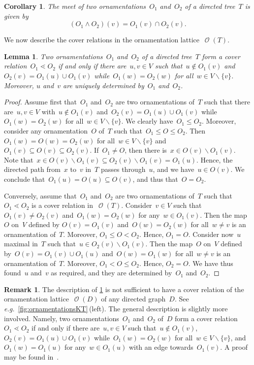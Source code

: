 \documentclass{amsart}
\newtheorem{corollary}[theorem]{Corollary}
\newtheorem{lemma}[theorem]{Lemma}
\theoremstyle{definition}
\newtheorem{remark}[theorem]{Remark}
\renewcommand{\c}[1]{\mathcal{#1}} %
\newcommand{\ssm}{\smallsetminus} %
\newcommand{\eg}{\textit{e.g.}~} %
\newcommand{\meet}{\wedge} %
\DeclareMathOperator{\Orn}{\c{O}}  %
\begin{document}
\begin{corollary}
\label{coro:meetOrnT}
The meet of two ornamentations~$O_1$ and~$O_2$ of a directed tree~$T$ is given by
\[
(O_1 \meet O_2)(v) = O_1(v) \cap O_2(v).
\]
\end{corollary}

We now describe the cover relations in the ornamentation lattice~$\Orn(T)$.

\begin{lemma}
\label{lem:coverRelationsOrnT}
Two ornamentations~$O_1$ and~$O_2$ of a directed tree~$T$ form a cover relation~$O_1 \lessdot O_2$ if and only if there are~$u, v \in V$ such that~$u \notin O_1(v)$ and $O_2(v) = O_1(u) \cup O_1(v)$ while~$O_1(w) = O_2(w)$ for all~${w \in V \ssm \{v\}}$.
Moreover, $u$ and~$v$ are uniquely determined by~$O_1$ and~$O_2$.
\end{lemma}

\begin{proof}
Assume first that~$O_1$ and~$O_2$ are two ornamentations of~$T$ such that there are~$u, v \in V$ with~$u \notin O_1(v)$ and~$O_2(v) = O_1(u) \cup O_1(v)$ while~$O_1(w) = O_2(w)$ for all~${w \in V \ssm \{v\}}$.
We clearly have~$O_1 \le O_2$.
Moreover, consider any ornamentation~$O$ of~$T$ such that~$O_1 \le O \le O_2$.
Then~$O_1(w) = O(w) = O_2(w)$ for all~${w \in V \ssm \{v\}}$ and~$O_1(v) \subseteq O(v) \subseteq O_2(v)$.
If~$O_1 \ne O$, then there is~$x \in O(v) \ssm O_1(v)$.
Note that~$x \in O(v) \ssm O_1(v) \subseteq O_2(v) \ssm  O_1(v) = O_1(u)$.
Hence, the directed path from~$x$ to~$v$ in~$T$ passes through~$u$, and we have~$u \in O(v)$.
We conclude that~$O_1(u) = O(u) \subseteq O(v)$, and thus that~$O = O_2$.

Conversely, assume that~$O_1$ and~$O_2$ are two ornamentations of~$T$ such that~$O_1 \lessdot O_2$ is a cover relation in~$\Orn(T)$.
Consider~$v \in V$ such that~$O_1(v) \ne O_2(v)$ and~$O_1(w) = O_2(w)$ for any~$w \in O_1(v)$.
Then the map~$O$ on~$V$ defined by $O(v) = O_1(v)$ and~$O(w) = O_2(w)$ for all~$w \ne v$ is an ornamentation of~$T$.
Moreover, $O_1 \le O < O_2$.
Hence, $O_1 = O$.
Consider now~$u$ maximal in~$T$ such that~$u \in O_2(v) \ssm O_1(v)$.
Then the map~$O$ on~$V$ defined by~$O(v) = O_1(v) \cup O_1(u)$ and~$O(w) = O_1(w)$ for all~$w \ne v$ is an ornamentation of~$T$.
Moreover, $O_1 < O \le O_2$.
Hence, $O_2 = O$.
We have thus found~$u$ and~$v$ as required, and they are determined by~$O_1$ and~$O_2$.
\end{proof}

\begin{remark}
\label{rem:coverRelationsOrn}
The description of \cref{lem:coverRelationsOrnT} is not sufficient to have a cover relation of the ornamentation lattice~$\Orn(D)$ of any directed graph~$D$.
See \eg \cref{fig:ornamentationsKT}\,(left).
The general description is slightly more involved.
Namely, two ornamentations~$O_1$ and~$O_2$ of~$D$ form a cover relation~$O_1 \lessdot O_2$ if and only if there are~$u, v \in V$ such that~$u \notin O_1(v)$, $O_2(v) = O_1(u) \cup O_1(v)$ while~$O_1(w) = O_2(w)$ for all~${w \in V \ssm \{v\}}$, and~$O_1(w) = O_1(u)$ for any~$w \in O_1(u)$ with an edge towards~$O_1(v)$. A proof may be found in~\cite{Sack}.
\end{remark}
\end{document}
